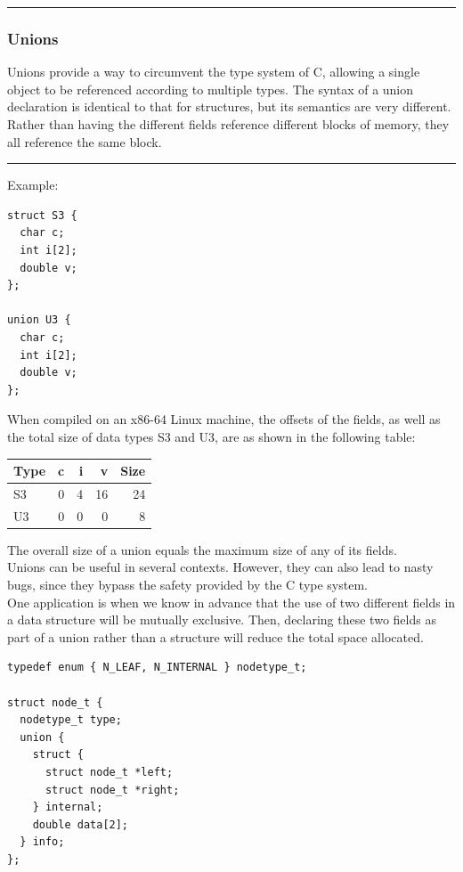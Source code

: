 \documentclass[11pt]{article}
\begin{document}
\noindent\rule{\textwidth}{0.5pt}

\subsubsection{Unions}
\label{sec:orgc0ffff7}
Unions provide a way to circumvent the type system of C, allowing a single object to be referenced according to multiple types. The syntax of a union declaration is identical to that for structures, but its semantics are very different. Rather than having the different fields reference different blocks of memory, they all reference the same block.\\

\noindent\rule{\textwidth}{0.5pt}
Example:\\
\begin{verbatim}
struct S3 {
  char c;
  int i[2];
  double v;
};

union U3 {
  char c;
  int i[2];
  double v;
};

\end{verbatim}

When compiled on an x86-64 Linux machine, the offsets of the fields, as well as the total size of data types S3 and U3, are as shown in the following table:\\
\begin{center}
\begin{tabular}{lrrrr}
Type & c & i & v & Size\\
\hline
S3 & 0 & 4 & 16 & 24\\
U3 & 0 & 0 & 0 & 8\\
\end{tabular}
\end{center}

The overall size of a union equals the maximum size of any of its fields.\\

Unions can be useful in several contexts. However, they can also lead to nasty bugs, since they bypass the safety provided by the C type system.\\

One application is when we know in advance that the use of two different fields in a data structure will be mutually exclusive. Then, declaring these two fields as part of a union rather than a structure will reduce the total space allocated.\\
\begin{verbatim}
typedef enum { N_LEAF, N_INTERNAL } nodetype_t;

struct node_t {
  nodetype_t type;
  union {
    struct {
      struct node_t *left;
      struct node_t *right;
    } internal;
    double data[2];
  } info;
};

\end{verbatim}
\end{document}
